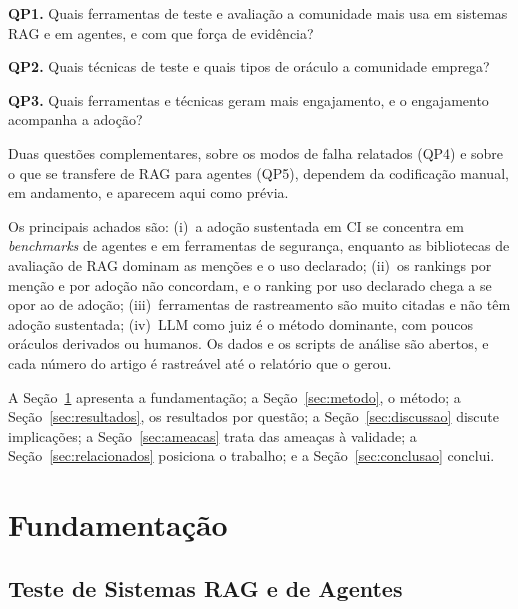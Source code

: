 \documentclass[sigconf]{acmart}
\begin{document}
\noindent\textbf{QP1.} Quais ferramentas de teste e avaliação a comunidade mais usa em sistemas RAG e em agentes, e com que força de evidência?

\noindent\textbf{QP2.} Quais técnicas de teste e quais tipos de oráculo a comunidade emprega?

\noindent\textbf{QP3.} Quais ferramentas e técnicas geram mais engajamento, e o engajamento acompanha a adoção?

\noindent Duas questões complementares, sobre os modos de falha relatados (QP4) e sobre o que se transfere de RAG para agentes (QP5), dependem da codificação manual, em andamento, e aparecem aqui como prévia.

Os principais achados são: (i)~a adoção sustentada em CI se concentra em \textit{benchmarks} de agentes e em ferramentas de segurança, enquanto as bibliotecas de avaliação de RAG dominam as menções e o uso declarado; (ii)~os rankings por menção e por adoção não concordam, e o ranking por uso declarado chega a se opor ao de adoção; (iii)~ferramentas de rastreamento são muito citadas e não têm adoção sustentada; (iv)~LLM como juiz é o método dominante, com poucos oráculos derivados ou humanos. Os dados e os scripts de análise são abertos, e cada número do artigo é rastreável até o relatório que o gerou.

A Seção~\ref{sec:fundamentacao} apresenta a fundamentação; a Seção~\ref{sec:metodo}, o método; a Seção~\ref{sec:resultados}, os resultados por questão; a Seção~\ref{sec:discussao} discute implicações; a Seção~\ref{sec:ameacas} trata das ameaças à validade; a Seção~\ref{sec:relacionados} posiciona o trabalho; e a Seção~\ref{sec:conclusao} conclui.

\section{Fundamentação}
\label{sec:fundamentacao}

\subsection{Teste de Sistemas RAG e de Agentes}
\end{document}

